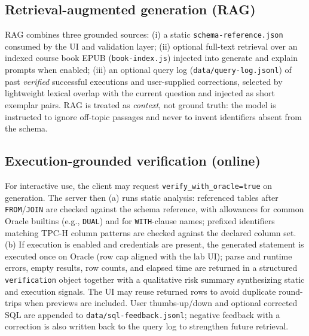 \subsection{Retrieval-augmented generation (RAG)}
RAG combines three grounded sources: (i) a static \texttt{schema-reference.json} consumed by the UI and validation layer; (ii) optional full-text retrieval over an indexed course book EPUB (\texttt{book-index.js}) injected into generate and explain prompts when enabled; (iii) an optional query log (\texttt{data/query-log.jsonl}) of past \emph{verified} successful executions and user-supplied corrections, selected by lightweight lexical overlap with the current question and injected as short exemplar pairs.
RAG is treated as \emph{context}, not ground truth: the model is instructed to ignore off-topic passages and never to invent identifiers absent from the schema.

\subsection{Execution-grounded verification (online)}
For interactive use, the client may request \texttt{verify\_with\_oracle=true} on generation.
The server then (a) runs static analysis: referenced tables after \texttt{FROM}/\texttt{JOIN} are checked against the schema reference, with allowances for common Oracle builtins (e.g., \texttt{DUAL}) and for \texttt{WITH}-clause names; prefixed identifiers matching TPC-H column patterns are checked against the declared column set.
(b) If execution is enabled and credentials are present, the generated statement is executed once on Oracle (row cap aligned with the lab UI); parse and runtime errors, empty results, row counts, and elapsed time are returned in a structured \texttt{verification} object together with a qualitative risk summary synthesizing static and execution signals.
The UI may reuse returned rows to avoid duplicate round-trips when previews are included.
User thumbs-up/down and optional corrected SQL are appended to \texttt{data/sql-feedback.jsonl}; negative feedback with a correction is also written back to the query log to strengthen future retrieval.

